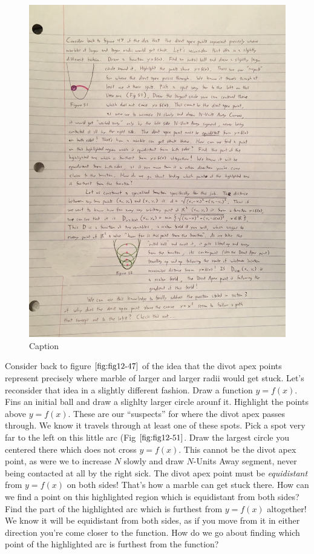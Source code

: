 \begin{figure}
  \includegraphics[width=.9\linewidth]{solving-divot-paths-img/Fig 12-51.png}
  \caption{Caption}
  \label{fig:fig12-51}
\end{figure}

Consider back to figure $\ref{fig:fig12-47}$ of the idea that the divot apex points represent precisely where marble of larger and larger radii would get stuck. Let's reconsider that idea in a slightly different fashion. Draw a function $y = f(x)$. Fins an initial ball and draw a slighlty larger circle arounf it. Highlight the points above $y = f(x)$. These are our ``suspects'' for where the divot apex passes through. We know it travels through at least one of these spots. Pick a spot very far to the left on this little arc (Fig $\ref{fig:fig12-51}$. Draw the largest circle you centered there which does not cross $y = f(x)$. This cannot be the divot apex point, as were we to increase $N$ slowly and draw $N$-Units Away segment, never being contacted at all by the right sick. The divot apex point must be \textit{equidistant} from $y = f(x)$ on both sides! That's how a marble can get stuck there. How can we find a point on this highlighted region which is equidistant from both sides? Find the part of the highlighted arc which is furthest from $y = f(x)$ altogether! We know it will be equidistant from both sides, as if you move from it in either direction you're come closer to the function. How do we go about finding which point of the highlighted arc is furthest from the function?

